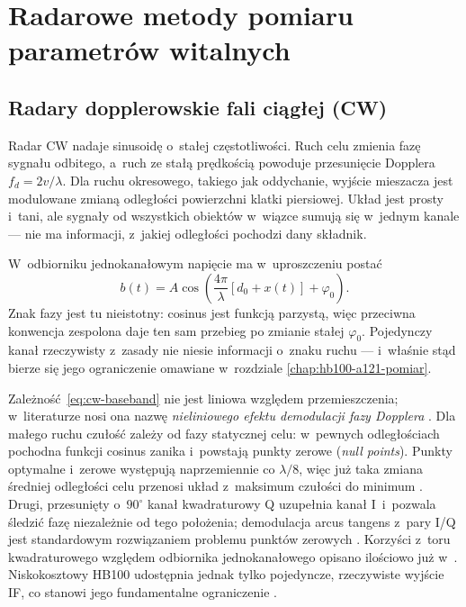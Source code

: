 \documentclass[12pt,a4paper,oneside]{report}
\begin{document}
\chapter{Radarowe metody pomiaru parametrów witalnych}

\section{Radary dopplerowskie fali ciągłej (CW)}
Radar CW nadaje sinusoidę o~stałej częstotliwości. Ruch celu zmienia fazę
sygnału odbitego, a~ruch ze stałą prędkością powoduje przesunięcie Dopplera
$f_d=2v/\lambda$. Dla ruchu okresowego, takiego jak oddychanie, wyjście
mieszacza jest modulowane zmianą odległości powierzchni klatki piersiowej.
Układ jest prosty i~tani, ale sygnały od wszystkich obiektów w~wiązce sumują
się w~jednym kanale --- nie ma informacji, z~jakiej odległości pochodzi dany
składnik.

W~odbiorniku jednokanałowym napięcie ma w~uproszczeniu postać
\begin{equation}
  b(t)=A\cos\!\left(\frac{4\pi}{\lambda}[d_0+x(t)]+\varphi_0\right).
  \label{eq:cw-baseband}
\end{equation}
Znak fazy jest tu nieistotny: cosinus jest funkcją parzystą, więc przeciwna
konwencja zespolona daje ten sam przebieg po zmianie stałej $\varphi_0$.
Pojedynczy kanał rzeczywisty z~zasady nie niesie informacji o~znaku ruchu ---
i~właśnie stąd bierze się jego ograniczenie omawiane w~rozdziale
\ref{chap:hb100-a121-pomiar}.

Zależność~\eqref{eq:cw-baseband} nie jest liniowa względem przemieszczenia;
w~literaturze nosi ona nazwę \emph{nieliniowego efektu demodulacji fazy
Dopplera} \cite{boriclubecke2016}. Dla małego ruchu czułość zależy od fazy
statycznej celu: w~pewnych odległościach pochodna funkcji cosinus zanika
i~powstają punkty zerowe (\emph{null points}). Punkty optymalne i~zerowe
występują naprzemiennie co $\lambda/8$, więc już taka zmiana średniej
odległości celu przenosi układ z~maksimum czułości do minimum
\cite{mercuri2017}. Drugi, przesunięty o~$90^\circ$ kanał kwadraturowy Q
uzupełnia kanał I~i~pozwala śledzić fazę niezależnie od tego położenia;
demodulacja arcus tangens z~pary I/Q jest standardowym rozwiązaniem problemu
punktów zerowych \cite{park2007}. Korzyści z~toru kwadraturowego względem
odbiornika jednokanałowego opisano ilościowo już w~\cite{droitcour2004}.
Niskokosztowy HB100 udostępnia jednak tylko pojedyncze, rzeczywiste wyjście IF,
co stanowi jego fundamentalne ograniczenie \cite{hb100_doc}.
\end{document}
